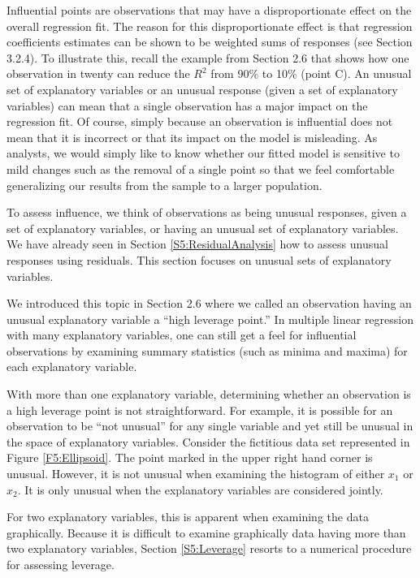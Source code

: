 Influential points are observations that may have a disproportionate
effect on the overall regression fit. The reason for this
disproportionate effect is that regression coefficients estimates
can be shown to be weighted sums of responses (see Section 3.2.4).
To illustrate this, recall the example from Section 2.6 that shows
how one observation in twenty can reduce the $R^2$ from 90\% to 10\%
(point C). An unusual set of explanatory variables or an unusual
response (given a set of explanatory variables) can mean that a
single observation has a major impact on the regression fit. Of
course, simply because an observation is influential does not mean
that it is incorrect or that its impact on the model is misleading.
As analysts, we would simply like to know whether our fitted model
is sensitive to mild changes such as the removal of a single point
so that we feel comfortable generalizing our results from the sample
to a larger population.

To assess influence, we think of observations as being unusual
responses, given a set of explanatory variables, or having an
unusual set of explanatory variables. We have already seen in
Section \ref{S5:ResidualAnalysis} how to assess unusual responses
using residuals. This section focuses on unusual sets of explanatory
variables.

We introduced this topic in Section 2.6 where we called an
observation having an unusual explanatory variable a ``high leverage
point.'' In multiple linear regression with many explanatory
variables, one can still get a feel for influential observations by
examining summary statistics (such as minima and maxima) for each
explanatory variable. 


With more than one explanatory variable, determining whether an
observation is a high leverage point is not straightforward. For
example, it is possible for an observation to be ``not unusual'' for
any single variable and yet still be unusual in the space of
explanatory variables. Consider the fictitious data set represented
in Figure \ref{F5:Ellipsoid}. The point marked in the upper right
hand corner is unusual. However, it is not unusual when examining
the histogram of either $x_1$ or $x_2$. It is only unusual when the
explanatory variables are considered jointly.

For two explanatory variables, this is apparent when examining the
data graphically. Because it is difficult to examine graphically
data having more than two explanatory variables, Section
\ref{S5:Leverage} resorts to a numerical procedure for assessing
leverage. 


